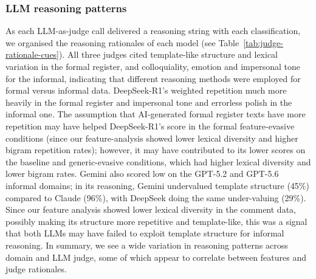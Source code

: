 \documentclass[thesis]{cluu}
\begin{document}
\subsubsection{LLM reasoning patterns} As each LLM-as-judge call delivered a reasoning string with each classification, we organised the reasoning rationales of each model (see Table~\ref{tab:judge-rationale-cues}). All three judges cited template-like structure and lexical variation in the formal register,  and colloquiality, emotion and impersonal tone for the informal, indicating that different reasoning methods were employed for formal versus informal data. DeepSeek-R1's weighted repetition much more heavily in the formal register and impersonal tone and errorless polish in the informal one. The assumption that AI-generated formal register texts have more repetition may have helped DeepSeek-R1's score in the formal feature-evasive conditions (since our feature-analysis showed lower lexical diversity and higher bigram repetition rates); however, it may have contributed to its lower scores on the baseline and generic-evasive conditions, which had higher lexical diversity and lower bigram rates. Gemini also scored low on the GPT-5.2 and GPT-5.6 informal domains; in its reasoning, Gemini undervalued template structure (45\%) compared to Claude (96\%), with DeepSeek doing the same under-valuing (29\%). Since our feature analysis showed lower lexical diversity in the comment data, possibly making its structure more repetitive and template-like, this was a signal that both LLMs may have failed to exploit template structure for informal reasoning. In summary, we see a wide variation in reasoning patterns across domain and LLM judge, some of which appear to correlate between features and judge rationales.
\end{document}
